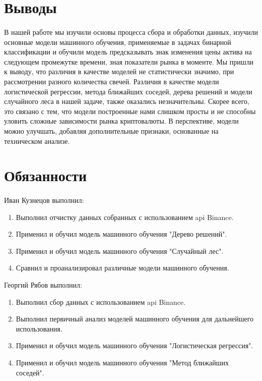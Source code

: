 \documentclass{article}
\begin{document}
	\section{Выводы}
	\paragraph{}
	В нашей работе мы изучили основы процесса сбора и обработки данных, изучили основные модели машинного обучения, применяемые в задачах бинарной классификации и обучили модель предсказывать знак изменения цены актива на следующем промежутке времени, зная показатели рынка в моменте. Мы пришли к выводу, что различия в качестве моделей не статистически значимо, при рассмотрении разного количества свечей. Различия в качестве модели логистической регрессии, метода ближайших соседей, дерева решений и модели случайного леса в нашей задаче, также оказались незначительны. Скорее всего, это связано с тем, что модели построенные нами слишком просты и не способны уловить сложные зависимости рынка криптовалюты. В перспективе, модели можно улучшать, добавляя дополнительные признаки, основанные на техническом анализе.
	\section{Обязанности}
	\paragraph{}
	Иван Кузнецов выполнил:
	\begin{enumerate}
		\item Выполнил отчистку данных собранных с использованием api Binance.
		\item Применил и обучил модель машинного обучения "Дерево решений".
		\item Применил и обучил модель машинного обучения "Случайный лес".
		\item Сравнил и проанализировал различные модели машинного обучения.
	\end{enumerate}
	
	Георгий Рябов выполнил:
	\begin{enumerate}
		\item Выполнил сбор данных с использованием api Binance.
		\item Выполнил первичный анализ моделей машинного обучения для дальнейшего использования.
		\item Применил и обучил модель машинного обучения "Логистическая регрессия".
		\item Применил и обучил модель машинного обучения "Метод ближайших соседей".
	\end{enumerate}
\end{document}
